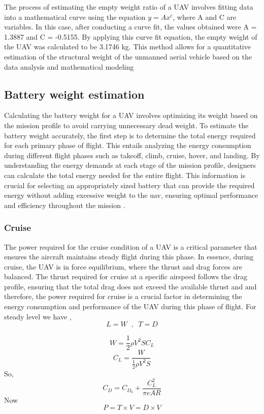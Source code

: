 \documentclass[12 pt]{article}
\begin{document}
The process of estimating the empty weight ratio of a UAV involves fitting data into a mathematical curve using the equation $y = A x^c$, where A and C are variables. In this case, after conducting a curve fit, the values obtained were A = 1.3887 and C = -0.5155. By applying this curve fit equation, the empty weight of the UAV was calculated to be 3.1746 kg. This method allows for a quantitative estimation of the structural weight of the unmanned aerial vehicle based on the data analysis and mathematical modeling

\subsection{{Battery weight estimation}}
Calculating the battery weight for a UAV  involves optimizing its weight based on the mission profile to avoid carrying unnecessary dead weight. To estimate the battery weight accurately, the first step is to determine the total energy required for each primary phase of flight. This entails analyzing the energy consumption during different flight phases such as takeoff, climb, cruise, hover, and landing. By understanding the energy demands at each stage of the mission profile, designers can calculate the total energy needed for the entire flight. This information is crucial for selecting an appropriately sized battery that can provide the required energy without adding excessive weight to the uav, ensuring optimal performance and efficiency throughout the mission
.

\subsubsection{{Cruise}}
The power required for the cruise condition of a UAV is a critical parameter that ensures the aircraft maintains steady flight during this phase. In essence, during cruise, the UAV is in force equilibrium, where the thrust and drag forces are balanced. The thrust required for cruise at a specific airspeed follows the drag profile, ensuring that the total drag does not exceed the available thrust and and therefore, the power required for cruise is a crucial factor in determining the energy consumption and performance of the UAV during this phase of flight.
For steady level we have ,
$$ L = W \; \; , \; \; T = D$$

$$ W = \frac{1}{2} \rho V^2 S C_L $$
$$ C_L = \frac{W}{\frac{1}{2} \rho V^2 S}$$
So,
$$ C_D = C_{D_0} + \frac{C_L^2}{\pi e AR} $$
Now 
$$ P = T\times V = D\times V $$
\end{document}
